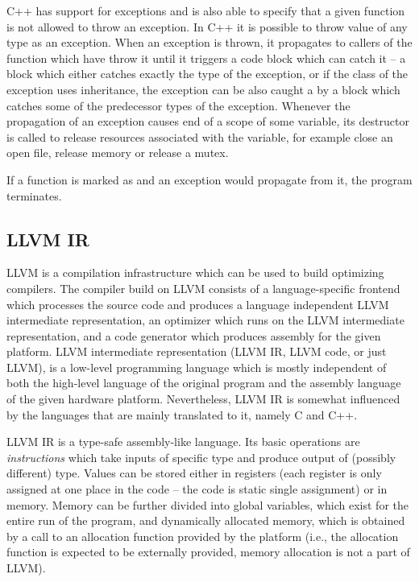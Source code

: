 C++ has support for exceptions and is also able to specify that a given function
is not allowed to throw an exception.
In C++ it is possible to throw value of any type as an exception.
When an exception is thrown, it propagates to callers of the function which
have throw it until it triggers a  code block which can catch it --
a  block which either catches exactly the type of the exception, or
if the class of the exception uses inheritance, the exception can be also
caught a by a  block which catches some of the predecessor types of
the exception.
Whenever the propagation of an exception causes end of a scope of some variable, its destructor is called to release resources associated with the variable, for example close an open file, release memory or release a mutex.

If a function is marked as  and an exception would propagate from
it, the program terminates.


\subsection{LLVM IR} %

LLVM is a compilation infrastructure which can be used to build optimizing
compilers.
The compiler build on LLVM consists of a language-specific frontend which
processes the source code and produces a language independent LLVM intermediate
representation, an optimizer which runs on the LLVM intermediate
representation, and a code generator which produces assembly for the given
platform.
LLVM intermediate representation (LLVM IR, LLVM code, or just LLVM), is a
low-level programming language which is mostly independent of both the
high-level language of the original program and the assembly language of the
given hardware platform.
Nevertheless, LLVM IR is somewhat influenced by the languages that are mainly
translated to it, namely C and C++.

LLVM IR is a type-safe assembly-like language.
Its basic operations are \emph{instructions} which take inputs of specific type
and produce output of (possibly different) type.
Values can be stored either in registers (each register is only assigned at one
place in the code -- the code is static single assignment) or in memory.
Memory can be further divided into global variables, which exist for the entire
run of the program, and dynamically allocated memory, which is obtained by a
call to an allocation function provided by the platform (i.e., the allocation
function is expected to be externally provided, memory allocation is not a part
of LLVM).

